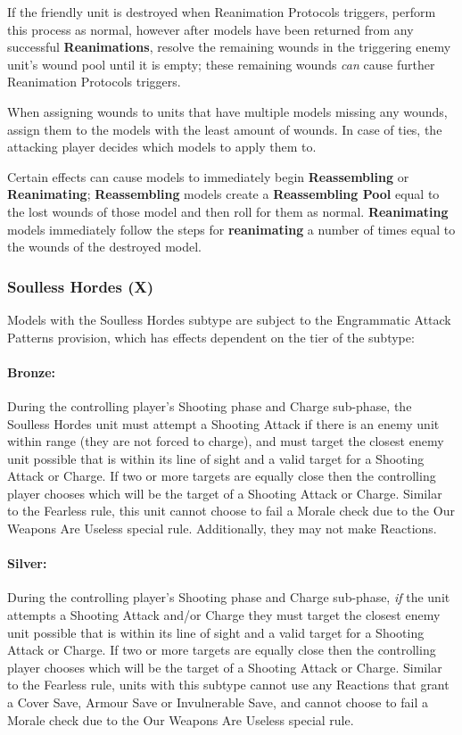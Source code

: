 If the friendly unit is destroyed when Reanimation Protocols triggers, perform this process as normal, however after models have been returned from any successful \textbf{Reanimations}, resolve the remaining wounds in the triggering enemy unit's wound pool until it is empty; these remaining wounds \textit{can} cause further Reanimation Protocols triggers.

When assigning wounds to units that have multiple models missing any wounds, assign them to the models with the least amount of wounds. In case of ties, the attacking player decides which models to apply them to.

Certain effects can cause models to immediately begin \textbf{Reassembling} or \textbf{Reanimating}; \textbf{Reassembling} models create a \textbf{Reassembling Pool} equal to the lost wounds of those model and then roll for them as normal. \textbf{Reanimating} models immediately follow the steps for \textbf{reanimating} a number of times equal to the wounds of the destroyed model.

\subsubsection{Soulless Hordes (X)} \label{Soulless Hordes}

Models with the Soulless Hordes subtype are subject to the Engrammatic Attack Patterns provision, which has effects dependent on the tier of the subtype:

\paragraph{Bronze:} During the controlling player's Shooting phase and Charge sub-phase, the Soulless Hordes unit must attempt a Shooting Attack if there is an enemy unit within range (they are not forced to charge), and must target the closest enemy unit possible that is within its line of sight and a valid target for a Shooting Attack or Charge. If two or more targets are equally close then the controlling player chooses which will be the target of a Shooting Attack or Charge. Similar to the Fearless rule, this unit cannot choose to fail a Morale check due to the Our Weapons Are Useless special rule. Additionally, they may not make Reactions.

\paragraph{Silver:} During the controlling player's Shooting phase and Charge sub-phase, \textit{if} the unit attempts a Shooting Attack and/or Charge they must target the closest enemy unit possible that is within its line of sight and a valid target for a Shooting Attack or Charge. If two or more targets are equally close then the controlling player chooses which will be the target of a Shooting Attack or Charge. Similar to the Fearless rule, units with this subtype cannot use any Reactions that grant a Cover Save, Armour Save or Invulnerable Save, and cannot choose to fail a Morale check due to the Our Weapons Are Useless special rule.

